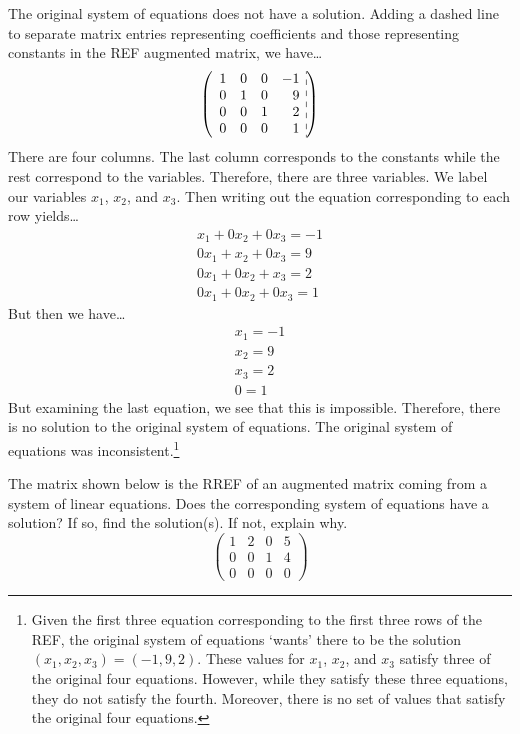 \documentclass[12pt,letterpaper]{exam}
\begin{document}
\begin{questions}
\sol The original system of equations does not have a solution. Adding a dashed line to separate matrix entries representing coefficients and those representing constants in the REF augmented matrix, we have\dots
	\[
	\left(
	\begin{array}{rrrr:r}
	1 & 0 & 0 & -1 \\
	0 & 1 & 0 & 9 \\
	0 & 0 & 1 & 2 \\
	0 & 0 & 0 & 1
	\end{array} 
	\right)
	\]
There are four columns. The last column corresponds to the constants while the rest correspond to the variables. Therefore, there are three variables. We label our variables $x_1$, $x_2$, and $x_3$. Then writing out the equation corresponding to each row yields\dots
	\[
	\begin{gathered}
	x_1 + 0x_2 + 0x_3= -1 \\
	0x_1 + x_2 + 0x_3= 9 \\
	0x_1 + 0x_2 + x_3= 2 \\
	0x_1 + 0x_2 + 0x_3= 1
	\end{gathered}
	\]
But then we have\dots
	\[
	\begin{gathered}
	x_1= -1 \\
	x_2= 9 \\
	x_3= 2 \\
	0= 1
	\end{gathered}
	\]
But examining the last equation, we see that this is impossible. Therefore, there is no solution to the original system of equations. The original system of equations was inconsistent.\footnote{Given the first three equation corresponding to the first three rows of the REF, the original system of equations `wants' there to be the solution $(x_1, x_2, x_3)= (-1, 9, 2)$. These values for $x_1$, $x_2$, and $x_3$ satisfy three of the original four equations. However, while they satisfy these three equations, they do not satisfy the fourth. Moreover, there is no set of values that satisfy the original four equations.} 



\newpage
\question[10] The matrix shown below is the RREF of an augmented matrix coming from a system of linear equations. Does the corresponding system of equations have a solution? If so, find the solution(s). If not, explain why. 
	\[
	\begin{pmatrix}
	1 & 2 & 0 & 5 \\
	0 & 0 & 1 & 4 \\
	0 & 0 & 0 & 0 
	\end{pmatrix}
	\] 


\end{questions}
\end{document}
